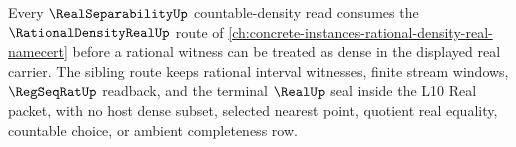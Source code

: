 Every $\RealSeparabilityUp$ countable-density read consumes the $\RationalDensityRealUp$ route of \autoref{ch:concrete-instances-rational-density-real-namecert} before a rational witness can be treated as dense in the displayed real carrier. The sibling route keeps rational interval witnesses, finite stream windows, $\RegSeqRatUp$ readback, and the terminal $\RealUp$ seal inside the L10 Real packet, with no host dense subset, selected nearest point, quotient real equality, countable choice, or ambient completeness row.
